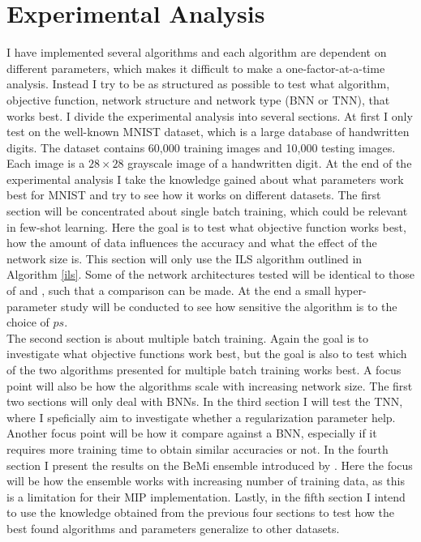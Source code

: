 \section{Experimental Analysis}

I have implemented several algorithms and each algorithm are dependent on different parameters, which makes it difficult to make a one-factor-at-a-time analysis. Instead I try to be as structured as possible to test what algorithm, objective function, network structure and network type (BNN or TNN), that works best. 
I divide the experimental analysis into several sections. At first I only test on the well-known MNIST dataset, which is a large database of handwritten digits. The dataset contains 60,000 training images and 10,000 testing images. Each image is a $28 \times 28$ grayscale image of a handwritten digit. At the end of the experimental analysis I take the knowledge gained about what parameters work best for MNIST and try to see how it works on different datasets. The first section will be concentrated about single batch training, which could be relevant in few-shot learning. Here the goal is to test what objective function works best, how the amount of data influences the accuracy and what the effect of the network size is. This section will only use the ILS algorithm outlined in Algorithm \ref{ils}. Some of the network architectures tested will be identical to those of \cite{icarte2019} and \cite{thorbjarnason2023}, such that a comparison can be made. At the end a small hyper-parameter study will be conducted to see how sensitive the algorithm is to the choice of $ps$. \\

\noindent The second section is about multiple batch training. Again the goal is to investigate what objective functions work best, but the goal is also to test which of the two algorithms presented for multiple batch training works best. A focus point will also be how the algorithms scale with increasing network size. 
The first two sections will only deal with BNNs. In the third section I will test the TNN, where I speficially aim to investigate whether a regularization parameter help. Another focus point will be how it compare against a BNN, especially if it requires more training time to obtain similar accuracies or not. 
In the fourth section I present the results on the BeMi ensemble introduced by \cite{ambrogio2023}. Here the focus will be how the ensemble works with increasing number of training data, as this is a limitation for their MIP implementation. Lastly, in the fifth section I intend to use the knowledge obtained from the previous four sections to test how the best found algorithms and parameters generalize to other datasets. \\

